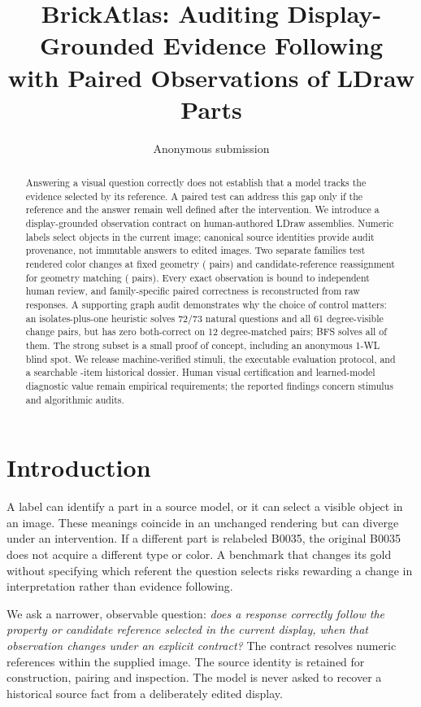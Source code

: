 \documentclass[10pt,twocolumn,letterpaper]{article}
\title{BrickAtlas: Auditing Display-Grounded Evidence Following\\
with Paired Observations of LDraw Parts}
\author{Anonymous submission}
\begin{document}
\maketitle

\begin{abstract}
Answering a visual question correctly does not establish that a model
tracks the evidence selected by its reference. A paired test can address
this gap only if the reference and the answer remain well defined after
the intervention. We introduce a display-grounded observation contract
on \EvSources{} human-authored LDraw assemblies. Numeric labels select
objects in the current image; canonical source identities provide audit
provenance, not immutable answers to edited images. Two separate families
test rendered color changes at fixed geometry (\EvColor{} pairs) and
candidate-reference reassignment for geometry matching (\EvType{} pairs).
Every exact observation is bound to independent human review, and
family-specific paired correctness is reconstructed from raw responses.
A supporting graph audit demonstrates why the choice of control matters:
an isolates-plus-one heuristic solves 72/73 natural questions and all
61 degree-visible change pairs, but has zero both-correct on 12
degree-matched pairs; BFS solves all of them. The strong subset is a
small proof of concept, including an anonymous 1-WL blind spot.
We release machine-verified stimuli, the executable evaluation protocol,
and a searchable \EvTasks{}-item historical dossier. Human visual
certification and learned-model diagnostic value remain empirical
requirements; the reported findings concern stimulus and algorithmic
audits.
\end{abstract}

\section{Introduction}
A label can identify a part in a source model, or it can select a visible
object in an image. These meanings coincide in an unchanged rendering
but can diverge under an intervention. If a different part is relabeled
B0035, the original B0035 does not acquire a different type or color.
A benchmark that changes its gold without specifying which referent
the question selects risks rewarding a change in interpretation rather
than evidence following.

We ask a narrower, observable question: \emph{does a response correctly
follow the property or candidate reference selected in the current
display, when that observation changes under an explicit contract?}
The contract resolves numeric references within the supplied image.
The source identity is retained for construction, pairing and inspection.
The model is never asked to recover a historical source fact from a
deliberately edited display.
\end{document}
